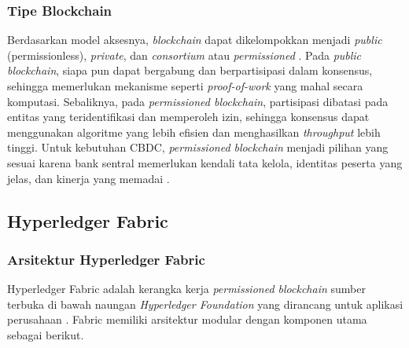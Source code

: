 

\subsubsection{Tipe Blockchain}

Berdasarkan model aksesnya, \textit{blockchain} dapat dikelompokkan menjadi
\textit{public} (permissionless), \textit{private}, dan \textit{consortium}
atau \textit{permissioned} \cite{bhawana2021}. Pada \textit{public blockchain},
siapa pun dapat bergabung dan berpartisipasi dalam konsensus, sehingga
memerlukan mekanisme seperti \textit{proof-of-work} yang mahal secara
komputasi. Sebaliknya, pada \textit{permissioned blockchain}, partisipasi
dibatasi pada entitas yang teridentifikasi dan memperoleh izin, sehingga
konsensus dapat menggunakan algoritme yang lebih efisien dan menghasilkan
\textit{throughput} lebih tinggi. Untuk kebutuhan CBDC, \textit{permissioned
blockchain} menjadi pilihan yang sesuai karena bank sentral memerlukan kendali
tata kelola, identitas peserta yang jelas, dan kinerja yang memadai
\cite{sethaput2025, unknown2025i}.

\subsection{Hyperledger Fabric}

\subsubsection{Arsitektur Hyperledger Fabric}

Hyperledger Fabric adalah kerangka kerja \textit{permissioned blockchain}
sumber terbuka di bawah naungan \textit{Hyperledger Foundation} yang dirancang
untuk aplikasi perusahaan \cite{androulaki2018}. Fabric memiliki arsitektur
modular dengan komponen utama sebagai berikut.


